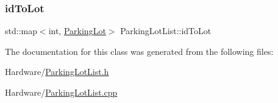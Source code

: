 \subsubsection{\texorpdfstring{id\+To\+Lot}{idToLot}}
{\footnotesize\ttfamily std\+::map$<$int, \mbox{\hyperlink{class_parking_lot}{Parking\+Lot}}$>$ Parking\+Lot\+List\+::id\+To\+Lot\hspace{0.3cm}{\ttfamily [private]}}



The documentation for this class was generated from the following files\+:\begin{DoxyCompactItemize}
\item 
Hardware/\mbox{\hyperlink{_parking_lot_list_8h}{Parking\+Lot\+List.\+h}}\item 
Hardware/\mbox{\hyperlink{_parking_lot_list_8cpp}{Parking\+Lot\+List.\+cpp}}\end{DoxyCompactItemize}
